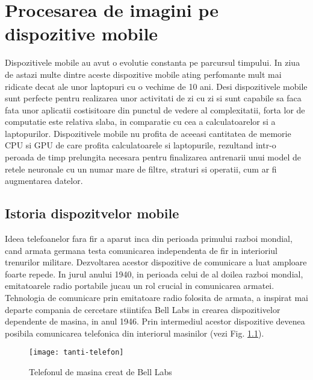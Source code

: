 
\chapter{Procesarea de imagini pe dispozitive mobile}
	Dispozitivele mobile au avut o evolutie constanta pe parcursul timpului. In ziua de astazi multe dintre aceste dispozitive mobile ating perfomante mult mai ridicate decat ale unor laptopuri cu o vechime de 10 ani. 
	Desi dispozitivele mobile sunt perfecte pentru realizarea unor activitati de zi cu zi si sunt capabile sa faca fata unor aplicatii costisitoare din punctul de vedere al complexitatii, forta lor de computatie este relativa slaba, in comparatie cu cea a calculatoarelor si a laptopurilor. Dispozitivele mobile nu profita de aceeasi cantitatea de memorie CPU si GPU de care profita calculatoarele si laptopurile, rezultand intr-o peroada de timp prelungita necesara pentru finalizarea antrenarii unui model de retele neuronale cu un numar mare de filtre, straturi si operatii, cum ar fi augmentarea datelor.
	
	\section{Istoria dispozitvelor mobile}
	Ideea telefoanelor fara fir a aparut inca din perioada primului razboi mondial, cand armata germana testa comunicarea independenta de fir in interioriul trenurilor militare. Dezvoltarea acestor dispozitive de comunicare a luat amploare foarte repede. In jurul anului 1940, in perioada celui de al doilea razboi mondial, emitatoarele radio portabile jucau un rol crucial in comunicarea armatei.
	Tehnologia de comunicare prin emitatoare radio folosita de armata, a inspirat mai departe compania de cercetare stiintifca Bell Labs in crearea dispozitivelor dependente de masina, in anul 1946. Prin intermediul acestor dispozitive devenea posibila comunicarea telefonica din interiorul masinilor (vezi Fig. \ref{fig:tanti-telefon}).
	
	\begin{figure}[H]
		\texttt{[image: tanti-telefon]}  
		\caption{\label{fig:tanti-telefon} Telefonul de masina creat de Bell Labs
			\protect
			\footnotemark}
	\end{figure}
	
	
